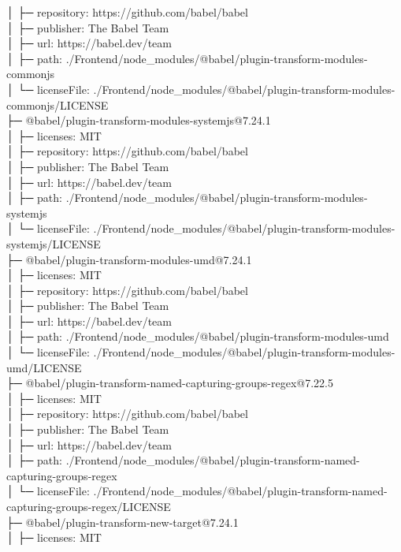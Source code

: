 │  ├─ repository: https://github.com/babel/babel\\
│  ├─ publisher: The Babel Team\\
│  ├─ url: https://babel.dev/team\\
│  ├─ path: ./Frontend/node\_modules/@babel/plugin-transform-modules-commonjs\\
│  └─ licenseFile: ./Frontend/node\_modules/@babel/plugin-transform-modules-commonjs/LICENSE\\
├─ @babel/plugin-transform-modules-systemjs@7.24.1\\
│  ├─ licenses: MIT\\
│  ├─ repository: https://github.com/babel/babel\\
│  ├─ publisher: The Babel Team\\
│  ├─ url: https://babel.dev/team\\
│  ├─ path: ./Frontend/node\_modules/@babel/plugin-transform-modules-systemjs\\
│  └─ licenseFile: ./Frontend/node\_modules/@babel/plugin-transform-modules-systemjs/LICENSE\\
├─ @babel/plugin-transform-modules-umd@7.24.1\\
│  ├─ licenses: MIT\\
│  ├─ repository: https://github.com/babel/babel\\
│  ├─ publisher: The Babel Team\\
│  ├─ url: https://babel.dev/team\\
│  ├─ path: ./Frontend/node\_modules/@babel/plugin-transform-modules-umd\\
│  └─ licenseFile: ./Frontend/node\_modules/@babel/plugin-transform-modules-umd/LICENSE\\
├─ @babel/plugin-transform-named-capturing-groups-regex@7.22.5\\
│  ├─ licenses: MIT\\
│  ├─ repository: https://github.com/babel/babel\\
│  ├─ publisher: The Babel Team\\
│  ├─ url: https://babel.dev/team\\
│  ├─ path: ./Frontend/node\_modules/@babel/plugin-transform-named-capturing-groups-regex\\
│  └─ licenseFile: ./Frontend/node\_modules/@babel/plugin-transform-named-capturing-groups-regex/LICENSE\\
├─ @babel/plugin-transform-new-target@7.24.1\\
│  ├─ licenses: MIT\\
